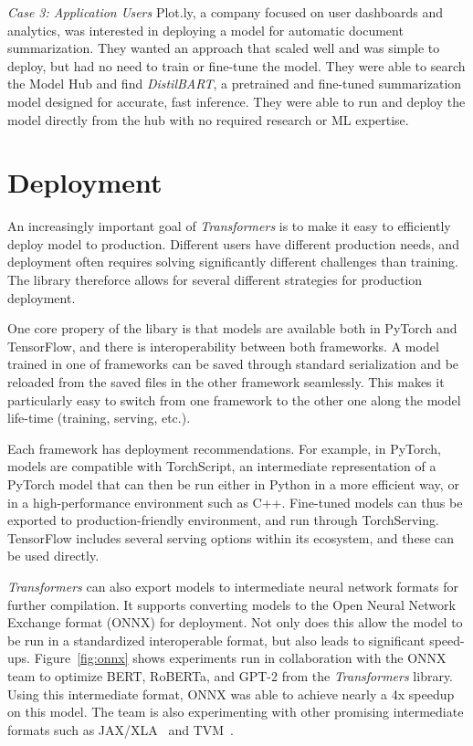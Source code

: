  \textit{Case 3: Application Users} Plot.ly, a company focused on user dashboards and analytics, was interested in deploying a model for automatic document summarization. They wanted an approach that scaled well and was simple to deploy, but had no need to train or fine-tune the model. They were able to search the Model Hub and find \textit{DistilBART}, a pretrained and fine-tuned summarization model designed for accurate, fast inference. They were able to run and deploy the model directly from the hub with no required research or ML expertise. 

\section{Deployment}

An increasingly important goal of \textit{Transformers} is to make it easy to efficiently deploy model to production. Different users have different production needs, and deployment often requires solving significantly different challenges than training. The library thereforce allows for several different strategies for production deployment.

One core propery of the libary is that models are available both in PyTorch and TensorFlow, and there is interoperability between both frameworks. A model trained in one of frameworks can be saved through standard serialization and be reloaded from the saved files in the other framework seamlessly. This makes it particularly easy to switch from one framework to the other one along the model life-time (training, serving, etc.).

Each framework has deployment recommendations. For example, in PyTorch, models are compatible with TorchScript, an intermediate representation of a PyTorch model that can then be run either in Python in a more efficient way, or in a high-performance environment such as C++. Fine-tuned models can thus be exported to production-friendly environment, and run through TorchServing. TensorFlow includes several serving options within its ecosystem, and these can be used directly. 

\textit{Transformers} can also export models to intermediate neural network formats for further compilation. It supports converting models to the Open Neural Network Exchange format (ONNX) for deployment. Not only does this allow the model to be run in a standardized interoperable format, but also leads to significant speed-ups. Figure~\ref{fig:onnx} shows experiments run in collaboration with the ONNX team to optimize BERT, RoBERTa, and GPT-2 from the \textit{Transformers} library. Using this intermediate format, ONNX was able to achieve nearly a 4x speedup on this model. The team is also experimenting with other promising intermediate formats such as JAX/XLA~\cite{jax2018github} and  TVM~\cite{chen2018tvm}.

